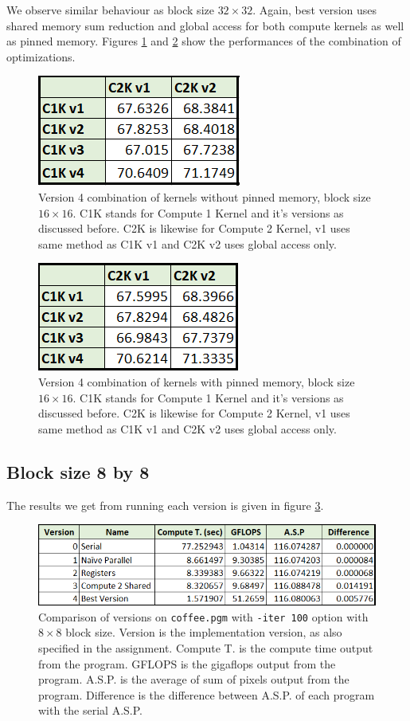 \documentclass[12pt,reqno]{amsart}
\newcommand{\code}[1]{\texttt{#1}}
\begin{document}
We observe similar behaviour as block size $32\times32$. Again, best version uses shared memory sum reduction and global access for both compute kernels as well as pinned memory. Figures \ref{fig:v4nopin16} and \ref{fig:v4yepin16} show the performances of the combination of optimizations.
\begin{figure}[h]
\centering
\includegraphics[width=0.45\linewidth]{v4nopin16.png}
\caption{Version 4 combination of kernels without pinned memory, block size $16\times16$. C1K stands for Compute 1 Kernel and it's versions as discussed before. C2K is likewise for Compute 2 Kernel, v1 uses same method as C1K v1 and C2K v2 uses global access only.}
\label{fig:v4nopin16}
\end{figure}

\begin{figure}[h]
\centering
\includegraphics[width=0.45\linewidth]{v4yepin16.png}
\caption{Version 4 combination of kernels with pinned memory, block size $16\times16$. C1K stands for Compute 1 Kernel and it's versions as discussed before. C2K is likewise for Compute 2 Kernel, v1 uses same method as C1K v1 and C2K v2 uses global access only.}
\label{fig:v4yepin16}
\end{figure}

\subsection{Block size 8 by 8}
The results we get from running each version is given in figure \ref{fig:rescomp8}.
\begin{figure}[h]
\centering
\includegraphics[width=0.9\linewidth]{allresults8.png}
\caption{Comparison of versions on \code{coffee.pgm} with \code{-iter 100} option with $8\times8$ block size. Version is the implementation version, as also specified in the assignment. Compute T. is the compute time output from the program. GFLOPS is the gigaflops output from the program. A.S.P. is the average of sum of pixels output from the program. Difference is the difference between A.S.P. of each program with the serial A.S.P.}
\label{fig:rescomp8}
\end{figure}
\end{document}
